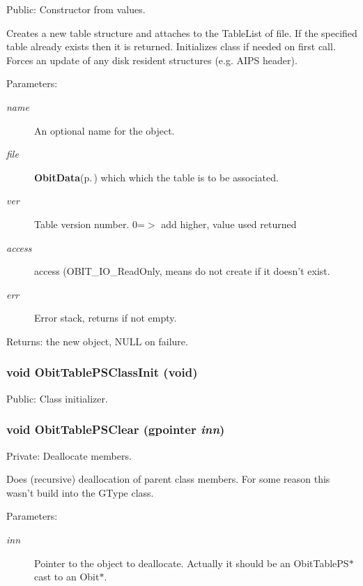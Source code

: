Public: Constructor from values. 

Creates a new table structure and attaches to the Table\-List of file. If the specified table already exists then it is returned. Initializes class if needed on first call. Forces an update of any disk resident structures (e.g. AIPS header). \begin{Desc}
\item[Parameters:]
\begin{description}
\item[{\em name}]An optional name for the object. \item[{\em file}]{\bf Obit\-Data}{\rm (p.\,\pageref{structObitData})} which which the table is to be associated. \item[{\em ver}]Table version number. 0=$>$ add higher, value used returned \item[{\em access}]access (OBIT\_\-IO\_\-Read\-Only, means do not create if it doesn't exist. \item[{\em err}]Error stack, returns if not empty. \end{description}
\end{Desc}
\begin{Desc}
\item[Returns:]the new object, NULL on failure. \end{Desc}
\subsubsection{\setlength{\rightskip}{0pt plus 5cm}void Obit\-Table\-PSClass\-Init (void)}\label{ObitTablePS_8c_a27}


Public: Class initializer. 

\subsubsection{\setlength{\rightskip}{0pt plus 5cm}void Obit\-Table\-PSClear (gpointer {\em inn})}\label{ObitTablePS_8c_a9}


Private: Deallocate members. 

Does (recursive) deallocation of parent class members. For some reason this wasn't build into the GType class. \begin{Desc}
\item[Parameters:]
\begin{description}
\item[{\em inn}]Pointer to the object to deallocate. Actually it should be an Obit\-Table\-PS$\ast$ cast to an Obit$\ast$. \end{description}
\end{Desc}
